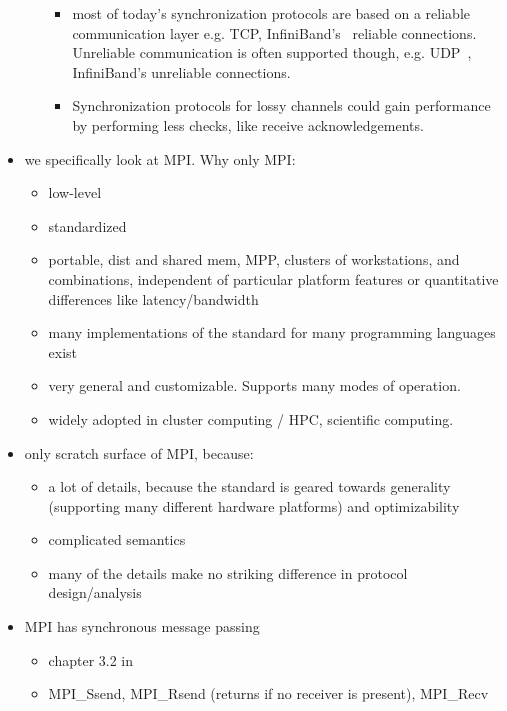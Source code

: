 \documentclass[a4paper, 10pt]{article}
\begin{document}
\begin{itemize}
\begin{itemize}
				\begin{itemize}
					\item most of today's synchronization protocols are based on a reliable communication layer e.g. TCP, InfiniBand's~\cite{infiniband} reliable connections. Unreliable communication is often supported though, e.g. UDP~\cite{udp}, InfiniBand's unreliable connections.
					\item Synchronization protocols for lossy channels could gain performance by performing less checks, like receive acknowledgements.
				\end{itemize}
		\end{itemize}
	\label{why-only-mpi}
	\item we specifically look at MPI\cite{mpi}. Why only MPI:
		\begin{itemize}
			\item low-level
			\item standardized
			\item portable, dist and shared mem, MPP, clusters of workstations, and combinations, independent of particular platform features or quantitative differences like latency/bandwidth
			\item many implementations of the standard for many programming languages exist
			\item very general and customizable. Supports many modes of operation.
			\item widely adopted in cluster computing / HPC, scientific computing.~\cite{mpiadoptiona}\cite{mpiadoptionb}\cite{mpiadoptionc}
		\end{itemize}
	\item only scratch surface of MPI, because:
		\begin{itemize}
			\item a lot of details, because the standard is geared towards generality (supporting many different hardware platforms) and optimizability
			\item complicated semantics
			\item many of the details make no striking difference in protocol design/analysis
		\end{itemize}
	\item MPI has synchronous message passing
		\begin{itemize}
			\item chapter 3.2 in \cite{mpi3}
			\item MPI\_Ssend, MPI\_Rsend (returns if no receiver is present), MPI\_Recv
		\end{itemize}

\end{itemize}
\end{document}
